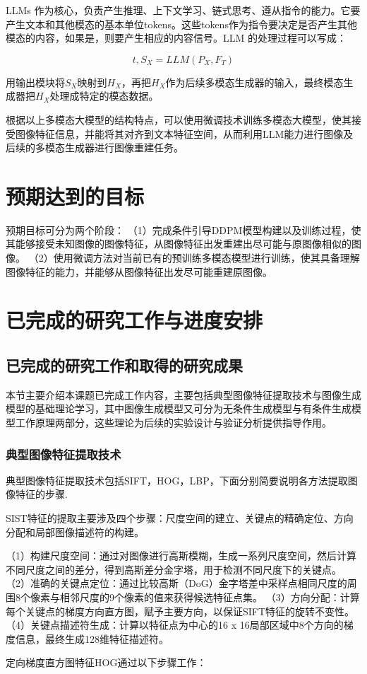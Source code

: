 LLMs 作为核心，负责产生推理、上下文学习、链式思考、遵从指令的能力。它要产生文本和其他模态的基本单位tokens。这些tokens作为指令要决定是否产生其他模态的内容，如果是，则要产生相应的内容信号。LLM 的处理过程可以写成：

\begin{equation}\label{eqn-10}
      t,S_X = LLM(P_X,F_T)
\end{equation}

用输出模块将$S_X$映射到$H_X$，再把$H_X$作为后续多模态生成器的输入，最终模态生成器把$H_X$处理成特定的模态数据。
\par
根据以上多模态大模型的结构特点，可以使用微调技术训练多模态大模型，使其接受图像特征信息，并能将其对齐到文本特征空间，从而利用LLM能力进行图像及后续的多模态生成器进行图像重建任务。
\section{预期达到的目标}
预期目标可分为两个阶段：
（1）完成条件引导DDPM模型构建以及训练过程，使其能够接受未知图像的图像特征，从图像特征出发重建出尽可能与原图像相似的图像。
（2）使用微调方法对当前已有的预训练多模态模型进行训练，使其具备理解图像特征的能力，并能够从图像特征出发尽可能重建原图像。


\section{已完成的研究工作与进度安排}
\subsection{已完成的研究工作和取得的研究成果}\label{sec:finishwork}
本节主要介绍本课题已完成工作内容，主要包括典型图像特征提取技术与图像生成模型的基础理论学习，其中图像生成模型又可分为无条件生成模型与有条件生成模型工作原理两部分，这些理论为后续的实验设计与验证分析提供指导作用。

\subsubsection{典型图像特征提取技术}
典型图像特征提取技术包括SIFT，HOG，LBP，下面分别简要说明各方法提取图像特征的步骤.

\par
SIST特征的提取主要涉及四个步骤：尺度空间的建立、关键点的精确定位、方向分配和局部图像描述符的构建。
\par
（1）构建尺度空间：通过对图像进行高斯模糊，生成一系列尺度空间，然后计算不同尺度之间的差分，得到高斯差分金字塔，用于检测不同尺度下的关键点。
（2）准确的关键点定位：通过比较高斯（DoG）金字塔差中采样点相同尺度的周围8个像素与相邻尺度的9个像素的值来获得候选特征点集。
（3）方向分配：‌计算每个关键点的梯度方向直方图，赋予主要方向，以保证SIFT特征的旋转不变性。
（4）关键点描述符生成：计算以特征点为中心的16 x 16局部区域中8个方向的梯度信息，最终生成128维特征描述符。
\par
定向梯度直方图特征HOG通过以下步骤工作：‌

